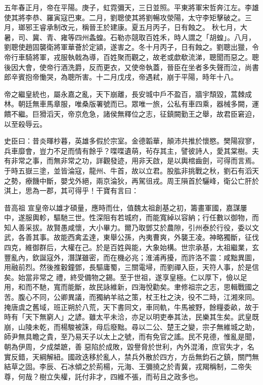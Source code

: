 \begin{pinyinscope}
 五年春正月，帝在平陽。庚子，虹霓彌天，三日並照。平東將軍宋哲奔江左。李雄使其將李恭、羅寅寇巴東。二月，劉聰使其將劉暢攻滎陽，太守李矩擊破之。三月，瑯邪王睿承制改元，稱晉王於建康。夏五月丙子，日有蝕之。
 秋七月，大暑，司、冀、青、雍等四州螽蝗。石勒亦競取百姓禾，時人謂之「胡蝗」。八月，劉聰使趙固襲衛將軍華薈於定潁，遂害之。冬十月丙子，日有蝕之。劉聰出獵，令帝行車騎將軍，戎服執戟為導，百姓聚而觀之，故老或歔欷流涕，聰聞而惡之。聰後因大會，使帝行酒洗爵，反而更衣，又使帝執蓋，晉臣在坐者多失聲而泣，尚書郎辛賓抱帝慟哭，為聰所害。十二月戊戌，帝遇弒，崩于平陽，時年十八。



 帝之繼皇統也，屬永嘉之亂，天下崩離，長安城中戶不盈百，牆宇頹毀，蒿棘成林。朝廷無車馬章服，唯桑版署號而已。眾唯一旅，公私有車四乘，器械多闕，運
 饋不繼。巨猾滔天，帝京危急，諸侯無釋位之志，征鎮闕勤王之舉，故君臣窘迫，以至殺辱云。



 史臣曰：昔炎暉杪暮，英雄多假於宗室。金德韜華，顛沛共推於懷愍。樊陽寂寥，兵車靡會，豈力不足而情有餘乎？喋喋遺萌，茍存其主，譬彼詩人，愛其棠樹。夫有非常之事，而無非常之功，詳觀發迹，用非天啟，是以輿棺齒劍，可得而言焉。于時五嶽三塗，並皆淪寇，龍州、牛首，故以立君。股肱非挑戰之秋，劉石有滔天之勢，療饑中斷，嬰戈外絕，兩京淪狄，再駕徂戎。周王隕首於驪峰，衛公亡肝於淇上，思為一郡，其可得乎！干寶有言曰：



 昔高祖
 宣皇帝以雄才碩量，應時而仕，值魏太祖創基之初，籌畫軍國，嘉謀屢中，遂服輿軫，驅馳三世。性深阻有若城府，而能寬綽以容納；行任數以御物，而知人善采拔。故賢愚咸懷，大小畢力。爾乃取鄧艾於農隙，引州泰於行役，委以文武，各善其事。故能西禽孟達，東舉公孫，內夷曹爽，外襲王凌。神略獨斷，征伐四克，維御群后，大權在己。於是百姓與能，大象始構。世宗承基，太祖繼業，玄豐亂內，欽誕寇外，潛謀雖密，而在機必兆；淮浦再擾，而許洛不震：咸黜異圖，用融前烈。然後推轂鐘鄧，長驅庸蜀，三關電埽，而劉禪入臣，天符人事，於是信矣。始當非常之
 禮，終受備物之錫。至于世祖，遂享皇極。仁以厚下，儉以足用，和而不馳，寬而能斷，故民詠維新，四海悅勸矣。聿修祖宗之志，思輯戰國之苦。腹心不同，公卿異議，而獨納羊祜之策，杖王杜之決，役不二時，江湘來同。掩唐虞之舊域，班正朔於八荒，天下書同文，車同軌，牛馬被野，餘糧委畝，故于時有「天下無窮人」之諺。雖太平未洽，亦足以明吏奉其法，民樂其生矣。武皇既崩，山陵未乾，而楊駿被誅，母后廢黜。尋以二公、楚王之變，宗子無維城之助，師尹無具瞻之貴，至乃易天子以太上之號，而有免官之謠。民不見德，惟亂是聞，朝為伊周，夕成桀蹠，善
 惡陷於成敗，毀譽脅於世利，內外混淆，庶官失才，名實反錯，天綱解紐。國政迭移於亂人，禁兵外散於四方，方岳無鈞石之鎮，關門無結草之固。李辰、石冰傾之於荊楊，元海、王彌撓之於青冀，戎羯稱制，二帝失尊，何哉？樹立失權，託付非才，四維不張，而茍且之政多也。




\end{pinyinscope}
